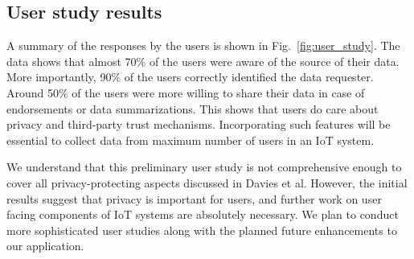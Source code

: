 \subsection{User study results}
A summary of the responses by the users is shown in Fig.~\ref{fig:user_study}. The data shows that almost 70\% of the users were aware of the source of their data. More importantly, 90\% of the users correctly identified the data requester. Around 50\% of the users were more willing to share their data in case of endorsements or data summarizations. This shows that users do care about privacy and third-party trust mechanisms. Incorporating such features will be essential to collect data from maximum number of users in an IoT system.

We understand that this preliminary user study is not comprehensive enough to cover all privacy-protecting aspects discussed in Davies et al. However, the initial results suggest that privacy is important for users, and further work on user facing components of IoT systems are absolutely necessary. We plan to conduct more sophisticated user studies along with the planned future enhancements to our application.